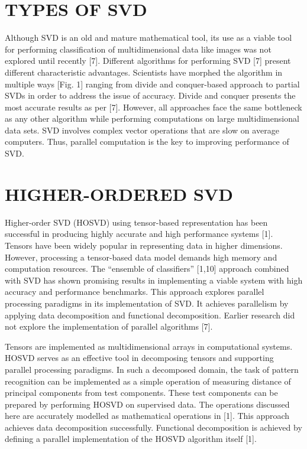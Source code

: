 \documentclass[12pt,a4paper]{article}
\begin{document}
	\section{\large TYPES OF SVD}
	\indent \par Although SVD is an old and mature mathematical tool, its use as a viable tool for performing classification of multidimensional data like images was not explored until recently [7]. Different algorithms for performing SVD [7] present different characteristic advantages. Scientists have morphed the algorithm in multiple ways [Fig. 1] ranging from divide and conquer-based approach to partial SVDs in order to address the issue of accuracy. Divide and conquer presents the most accurate results as per [7]. However, all approaches face the same bottleneck as any other algorithm while performing computations on large multidimensional data sets. SVD involves complex vector operations that are slow on average computers. Thus, parallel computation is the key to improving performance of SVD.
	
	\section{\large HIGHER-ORDERED SVD}
	\indent \par Higher-order SVD (HOSVD) using tensor-based representation has been successful in producing highly accurate and high performance systems [1]. Tensors have been widely popular in representing data in higher dimensions. However, processing a tensor-based data model demands high memory and computation resources. The “ensemble of classifiers” [1,10] approach combined with SVD has shown promising results in implementing a viable system with high accuracy and performance benchmarks. This approach explores parallel processing paradigms in its implementation of SVD. It achieves parallelism by applying data decomposition and functional decomposition. Earlier research did not explore the implementation of parallel algorithms [7]. \par
    Tensors are implemented as multidimensional arrays in computational systems. HOSVD serves as an effective tool in decomposing tensors and supporting parallel processing paradigms. In such a decomposed domain, the task of pattern recognition can be implemented as a simple operation of measuring distance of principal components from test components. These test components can be prepared by performing HOSVD on supervised data. The operations discussed here are accurately modelled as mathematical operations in [1]. This approach achieves data decomposition successfully. Functional decomposition is achieved by defining a parallel implementation of the HOSVD algorithm itself [1].
\end{document}
